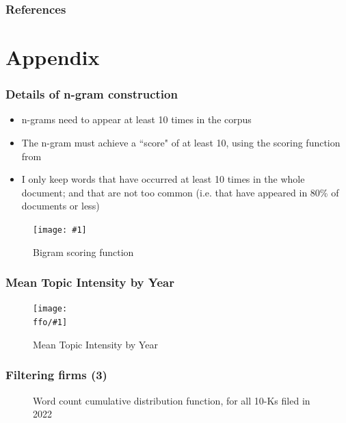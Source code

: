 \documentclass{beamer}
\newcommand{\ffo}{dicfullmc10thr10defnob40noa1_4t}
\newcommand{\insertfigurenoffo}[3]{
\begin{figure}[h!]
  \centering
  \texttt{[image: \#1]}
  \caption{#2}
  \label{fig:#1}
\end{figure}
}
\newcommand{\insertfigure}[2]{
\begin{figure}[h!]
  \centering
  \texttt{[image: \\ffo/\#1]}
  \centering
  \captionsetup{font=scriptsize}
  \caption{#2}
  \label{fig:#1}
\end{figure}
}
\begin{document}

\begin{frame}[allowframebreaks]
\frametitle{References}

\end{frame}

\section{Appendix}

\begin{frame}
\frametitle{Details of n-gram construction}
\label{ngram_details}
\begin{itemize}
\item n-grams need to appear at least 10 times in the corpus
\item The n-gram must achieve a ``score" of at least 10, using the scoring function from \cite{Mikolov2013-be} \hyperlink{ngram_main}{}
\item I only keep words that have occurred at least 10 times in the whole document; and that are not too common (i.e. that have appeared in 80\% of documents or less)
\end{itemize}
\insertfigurenoffo{mikolov_formula}{Bigram scoring function}{0.3}
\end{frame}

\begin{frame}
\frametitle{Mean Topic Intensity by Year}
\label{meantiy_details}
\hyperlink{results}{}
\insertfigure{mean_tiy}{Mean Topic Intensity by Year}
\end{frame}


\begin{frame}
\frametitle{Filtering firms (3)}
\label{min_words}
\begin{figure}
  \centering
  \hfill
  \caption{Word count cumulative distribution function, for all 10-Ks filed in 2022}
  \label{fig:cdf}
\end{figure}
\end{frame}
\end{document}
